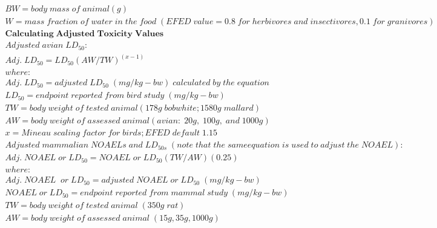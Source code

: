 \documentclass[10pt]{article}
\begin{document}
\begin{align*}
\\BW = body\; mass\; of \;animal (g)

\\W = mass \;fraction\; of\; water \;in\; the\; food\; (EFED\; value = 0.8 \;for \;herbivores\; and\; insectivores, 0.1 \;for \;granivores)




\\\mathbf{Calculating \; Adjusted \;Toxicity\; Values}
\\Adjusted \;avian \;LD_{50}:

\\Adj. \; LD_{50} = LD_{50} (AW / TW)^{(x-1)}

\\where:

\\Adj. \; LD_{50} = adjusted  \;LD_{50} \; (mg/kg-bw)  \;calculated \; by \; the  \;equation

\\LD_{50} = endpoint\; reported\; from\; bird\; study \;(mg/kg-bw)

\\TW = body \;weight\; of \;tested\; animal (178g\; bobwhite; 1580g\; mallard)

\\AW = body\; weight\; of \;assessed\; animal (avian:\; 20g,\; 100g, \;and \;1000g)

\\x = Mineau\; scaling \;factor\; for\; birds; EFED\; default \;1.15

\\Adjusted\; mammalian\; NOAELs \;and \;LD_{50s} \;(note \;that \;the\; same equation\; is \;used\; to\; adjust \;the \;NOAEL):


\\Adj.\; NOAEL\; or \;LD_{50}= NOAEL \;or \;LD_{50} (TW / AW)(0.25)

\\where:

\\Adj.\;  NOAEL\; \; or\; LD_{50}= adjusted\; NOAEL \;or \;LD_{50} \;(mg/kg-bw)

\\NOAEL \;or \;LD_{50} = endpoint \;reported\; from \;mammal\; study\; (mg/kg-bw)

\\TW = body \;weight \;of \;tested\; animal\; (350g\; rat)

\\AW = body \;weight \;of\;assessed\; animal\; (15g, 35g, 1000g)
\end{align*}
\end{document}

